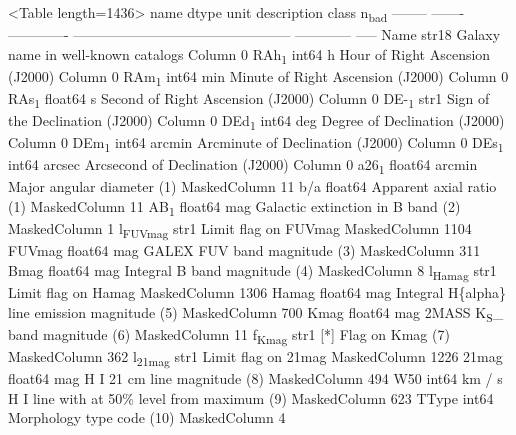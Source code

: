 \documentclass[11pt]{article}
\begin{document}
<Table length=1436>
  name    dtype       unit                       description                      class     n\textsubscript{bad}
-------- ------- ------------- ----------------------------------------------- ------------ -----
    Name   str18                            Galaxy name in well-known catalogs       Column     0
   RAh\textsubscript{1}   int64             h                 Hour of Right Ascension (J2000)       Column     0
   RAm\textsubscript{1}   int64           min               Minute of Right Ascension (J2000)       Column     0
   RAs\textsubscript{1} float64             s               Second of Right Ascension (J2000)       Column     0
   DE-\textsubscript{1}    str1                               Sign of the Declination (J2000)       Column     0
   DEd\textsubscript{1}   int64           deg                   Degree of Declination (J2000)       Column     0
   DEm\textsubscript{1}   int64        arcmin                Arcminute of Declination (J2000)       Column     0
   DEs\textsubscript{1}   int64        arcsec                Arcsecond of Declination (J2000)       Column     0
   a26\textsubscript{1} float64        arcmin                      Major angular diameter (1) MaskedColumn    11
     b/a float64                                      Apparent axial ratio (1) MaskedColumn    11
    AB\textsubscript{1} float64           mag               Galactic extinction in B band (2) MaskedColumn     1
l\textsubscript{FUVmag}    str1                                          Limit flag on FUVmag MaskedColumn  1104
  FUVmag float64           mag                    GALEX FUV band magnitude (3) MaskedColumn   311
    Bmag float64           mag                   Integral B band magnitude (4) MaskedColumn     8
 l\textsubscript{Hamag}    str1                                           Limit flag on Hamag MaskedColumn  1306
   Hamag float64           mag   Integral H\{alpha\} line emission magnitude (5) MaskedColumn   700
    Kmag float64           mag                   2MASS K\textsubscript{S}\_ band magnitude (6) MaskedColumn    11
  f\textsubscript{Kmag}    str1                                          [*] Flag on Kmag (7) MaskedColumn   362
 l\textsubscript{21mag}    str1                                           Limit flag on 21mag MaskedColumn  1226
   21mag float64           mag                    H I 21 cm line magnitude (8) MaskedColumn   494
     W50   int64        km / s     H I line with at 50\% level from maximum (9) MaskedColumn   623
   TType   int64                                     Morphology type code (10) MaskedColumn     4
\end{document}
